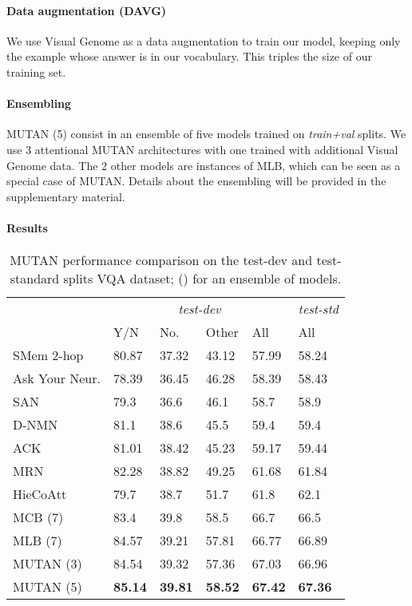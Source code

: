 \documentclass[10pt,twocolumn,letterpaper]{article}
\begin{document}
\paragraph{Data augmentation (DAVG)}
We use Visual Genome \cite{krishnavisualgenome} as a data augmentation to train our model, keeping only the example whose answer is in our vocabulary. This triples the size of our training set.
\vspace{-0.4cm}
\paragraph{Ensembling}
MUTAN (5) consist in an ensemble of five models trained on \emph{train+val} splits. We use 3 attentional MUTAN architectures with one trained with additional Visual Genome data. The 2 other models are instances of MLB, which can be seen as a special case of MUTAN. Details about the ensembling will be provided in the supplementary material.
 \vspace{-0.4cm}
\paragraph{Results}

\begin{table}
\begin{tabularx}{\columnwidth}{l*{4}{X}X}
\toprule
& \multicolumn{4}{c}{\textit{test-dev}} & \textit{test-std} \\
& Y/N & No. & Other & All & All\\
\hline
SMem 2-hop \cite{XuS16} & 80.87 & 37.32 & 43.12 & 57.99 & 58.24\\
Ask Your Neur. \cite{malinowski16ijcv} & 78.39 & 36.45 & 46.28 & 58.39 & 58.43\\
SAN \cite{YangHGDS16} & 79.3 & 36.6 & 46.1 & 58.7 & 58.9 \\
D-NMN \cite{AndreasRDK16} & 81.1 & 38.6 & 45.5 & 59.4 & 59.4 \\
ACK \cite{CVPR16AMA} & 81.01 & 38.42 & 45.23 & 59.17 & 59.44 \\
MRN \cite{kim2016b} & 82.28 & 38.82 & 49.25 & 61.68 & 61.84\\
HieCoAtt \cite{LuYBP16} & 79.7 & 38.7 & 51.7 & 61.8 & 62.1 \\
MCB (7) \cite{fukui16mcb} & 83.4 & 39.8 & 58.5 & 66.7 & 66.5 \\
MLB (7) \cite{Kim2017} & 84.57 & 39.21 & 57.81 & 66.77 & 66.89 \\
MUTAN (3) & 84.54 & 39.32 & 57.36 & 67.03 & 66.96 \\
MUTAN (5) & \textbf{85.14} & \textbf{39.81} & \textbf{58.52} & \textbf{67.42} & \textbf{67.36} \\
\bottomrule
\end{tabularx}
\caption{\label{sota} MUTAN performance comparison  on the test-dev and test-standard splits VQA dataset; () for an ensemble of  models.}
\end{table}
\end{document}
